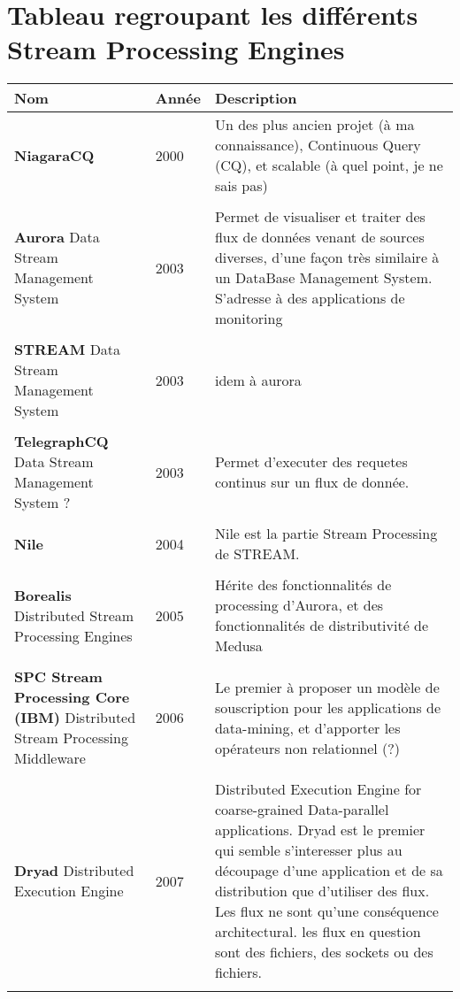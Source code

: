 \section{Tableau regroupant les différents Stream Processing Engines}

\newcommand{\SPEentry}[4]{%
  \textbf{#1} \newline%
  #2 &%
  #3 &%
  #4 \\%
  \\%
}

\begin{center}
  \begin{longtable}{p{7cm} l p{8cm}}
    Nom & Année & Description \\
    \hline

    \SPEentry{NiagaraCQ
    }{        
    }{         2000
    }{        Un des plus ancien projet (à ma connaissance), Continuous Query (CQ), et scalable (à quel point, je ne sais pas)
    }

    \SPEentry{Aurora
    }{          Data Stream Management System
    }{          2003
    }{          Permet de visualiser et traiter des flux de données venant de sources diverses, d'une façon très similaire à un DataBase Management System. S'adresse à des applications de monitoring
    }

    \SPEentry{STREAM
    }{        Data Stream Management System
    }{         2003
    }{        idem à aurora
    }

    \SPEentry{TelegraphCQ
    }{        Data Stream Management System ?
    }{         2003
    }{        Permet d'executer des requetes continus sur un flux de donnée.
    }

    \SPEentry{Nile
    }{        
    }{         2004
    }{        Nile est la partie Stream Processing de STREAM.
    }

    \SPEentry{Borealis
    }{        Distributed Stream Processing Engines
    }{         2005
    }{        Hérite des fonctionnalités de processing d'Aurora, et des fonctionnalités de distributivité de Medusa
    }

    \SPEentry{SPC Stream Processing Core (IBM)
    }{        Distributed Stream Processing Middleware
    }{         2006
    }{        Le premier à proposer un modèle de souscription pour les applications de data-mining, et d'apporter les opérateurs non relationnel (?)
    }

    \SPEentry{Dryad
    }{        Distributed Execution Engine
    }{         2007
    }{        Distributed Execution Engine for coarse-grained Data-parallel applications. Dryad est le premier qui semble s'interesser plus au découpage d'une application et de sa distribution que d'utiliser des flux. Les flux ne sont qu'une conséquence architectural. les flux en question sont des fichiers, des sockets ou des fichiers.
    }


\end{longtable}
\end{center}
